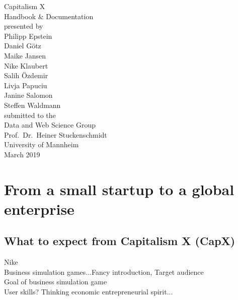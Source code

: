 \documentclass[11pt,titlepage,oneside,openany]{book}
\begin{document}
\begin{titlepage}
	\vspace*{2cm}
  \begin{center}
   {\Large Capitalism X\\}
   \vspace{2cm} 
   {Handbook \& Documentation\\}
   \vspace{2cm}
   {presented by\\
   Philipp Epstein \\
    Daniel G\"otz \\
Maike Jansen \\
Nike Klaubert \\
Salih \"Ozdemir \\
Livja Papuciu \\
Janine Salomon \\
Steffen Waldmann \\
   }
   \vspace{1cm} 
   {submitted to the\\
    Data and Web Science Group\\
    Prof.\ Dr.\ Heiner Stuckenschmidt\\
    University of Mannheim\\} \vspace{2cm}
   {March 2019}
  \end{center}
\end{titlepage} 

\tableofcontents
\newpage

\listoffigures

\listoftables
\printglossary[style=long]

\newpage

\chapter{From a small startup to a global enterprise}
\label{cha:intro}
\section{What to expect from Capitalism X (CapX)}
Nike\\
Business simulation games...Fancy introduction, Target audience\\
Goal of business simulation game\\
User skills? Thinking economic entrepreneurial spirit...\\
\end{document}
